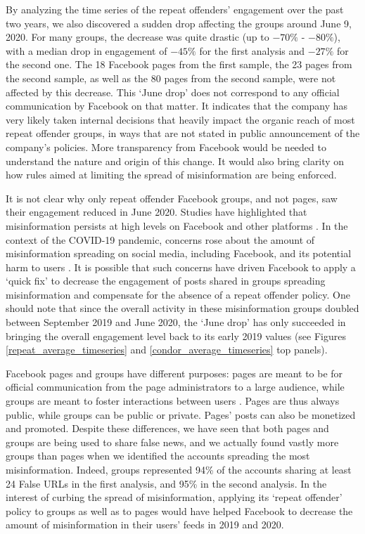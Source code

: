 \documentclass[review]{elsarticle}
\begin{document}
{{By analyzing the time series of the repeat offenders’ engagement over the past two years, we also discovered a sudden drop affecting the groups around June 9, 2020.
For many groups, the decrease was quite drastic (up to $-70\%$ - $-80\%$), with a median drop in engagement of $-45\%$ for the first analysis and $-27\%$ for the second one.
The 18 Facebook pages from the first sample, the 23 pages from the second sample, as well as the 80 pages from the second sample, were not affected by this decrease.
This `June drop' does not correspond to any official communication by Facebook on that matter. 
It indicates that the company has very likely taken internal decisions that heavily impact the organic reach of most repeat offender groups, in ways that are not stated in public announcement of the company's policies.
More transparency from Facebook would be needed to understand the nature and origin of this change. 
It would also bring clarity on how rules aimed at limiting the spread of misinformation are being enforced.

It is not clear why only repeat offender Facebook groups, and not pages, saw their engagement reduced in June 2020.
Studies have highlighted that misinformation persists at high levels on Facebook and other platforms \citep{kornbluh2020new, resnick2018iffy}.
In the context of the COVID-19 pandemic, concerns rose about the amount of misinformation spreading on social media, including Facebook, and its potential harm to users \citep{johnson2020online}.
It is possible that such concerns have driven Facebook to apply a `quick fix' to decrease the engagement of posts shared in groups spreading misinformation and compensate for the absence of a repeat offender policy.
One should note that since the overall activity in these misinformation groups doubled between September 2019 and June 2020, the `June drop' has only succeeded in bringing the overall engagement level back to its early 2019 values (see Figures \ref{repeat_average_timeseries} and \ref{condor_average_timeseries} top panels).

Facebook pages and groups have different purposes: pages are meant to be for official communication from the page administrators to a large audience, while groups are meant to foster interactions between users \citep{differenceGroupAndPage}. 
Pages are thus always public, while groups can be public or private.
Pages' posts can also be monetized and promoted.
Despite these differences, we have seen that both pages and groups are being used to share false news, and we actually found vastly more groups than pages when we identified the accounts spreading the most misinformation.
Indeed, groups represented 94\% of the accounts sharing at least 24 False URLs in the first analysis, and 95\% in the second analysis.
In the interest of curbing the spread of misinformation, applying its `repeat offender' policy to groups as well as to pages would have helped Facebook to decrease the amount of misinformation in their users’ feeds in 2019 and 2020.

}}
\end{document}
